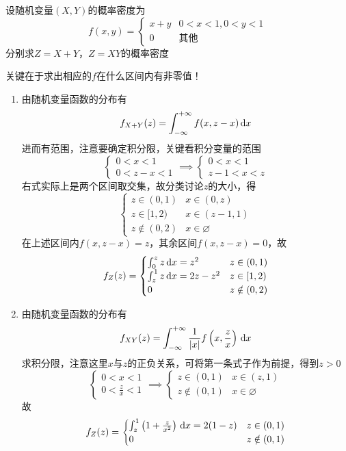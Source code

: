 \begin{example}
设随机变量$(X,Y)$的概率密度为
\[f(x,y)=\begin{cases}x+y&0<x<1,0<y<1\\0&\text{其他}\end{cases}\]
分别求$Z=X+Y$，$Z=XY$的概率密度
\end{example}
\begin{analysis}
关键在于求出相应的$f$在什么区间内有非零值！
\begin{enumerate}
	\item 由随机变量函数的分布有
	\[f_{X+Y}(z)=\int_{-\infty}^{+\infty}f(x,z-x)\,\mathrm{d} x\]
	进而有范围，注意要确定积分限，关键看积分变量的范围
	\[\begin{cases}0<x<1\\0<z-x<1\end{cases}\implies\begin{cases}0<x<1\\z-1<x<z\end{cases}\]
	右式实际上是两个区间取交集，故分类讨论$z$的大小，得
	\[\begin{cases}z\in(0,1)&x\in(0,z)\\z\in[1,2)&x\in(z-1,1)\\z\notin(0,2)&x\in\varnothing\end{cases}\]
	在上述区间内$f(x,z-x)=z$，其余区间$f(x,z-x)=0$，故
	\[f_Z(z)=\begin{cases}\int_0^zz\,\mathrm{d} x=z^2&z\in(0,1)\\\int_z^1z\,\mathrm{d} x=2z-z^2&z\in[1,2)\\0&z\notin(0,2)\end{cases}\]
	\item 由随机变量函数的分布有
	\[f_{XY}(z)=\int_{-\infty}^{+\infty}\frac{1}{|x|}f\left(x,\frac{z}{x}\right)\,\mathrm{d} x\]
	求积分限，注意这里$x$与$z$的正负关系，可将第一条式子作为前提，得到$z>0$
	\[\begin{cases}0<x<1\\0<\frac{z}{x}<1\end{cases}\implies\begin{cases}z\in(0,1)&x\in(z,1)\\z\notin(0,1)&x\in\varnothing\end{cases}\]
	故
	\[f_Z(z)=\begin{cases}\int_z^1\left(1+\frac{z}{x^2}\right)\,\mathrm{d} x=2(1-z)&z\in(0,1)\\0&z\notin(0,1)\end{cases}\]
\end{enumerate}
\end{analysis}

